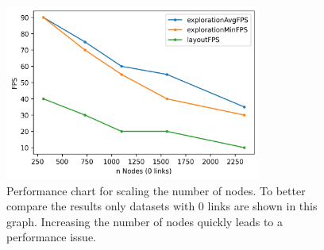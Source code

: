 \begin{table}[!hbt]
     \caption{Results from performance measurement evaluation separated into layout phase and exploration (expl.) phase. Test setup: Ryzen 7 3700X + Radeon RX 590.}
     \label{table:resultFPS}
\end{table}

\begin{figure}[!hbt]
    \centering
    \includegraphics[width=0.75\textwidth]{graphics/performanceAnalysisNodes.png}
    \caption{Performance chart for scaling the number of nodes. To better compare the results only datasets with 0 links are shown in this graph. Increasing the number of nodes quickly leads to a performance issue.} 
    \label{fig:performanceNodes} 
\end{figure}


